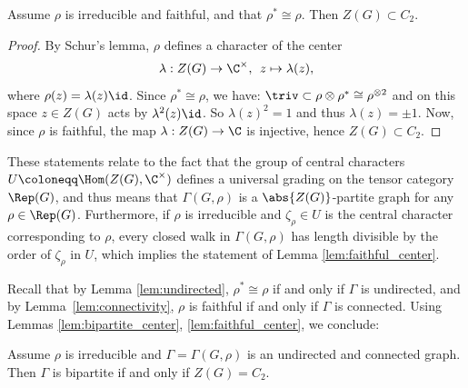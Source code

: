 \begin{lemma}\label{lem:faithful_center}
 Assume $\rho$ is irreducible and faithful, and that $\rho^* \cong \rho$. Then $Z(G) \subset C_2 $.
\end{lemma}

\begin{proof}
  By Schur's lemma, $\rho$ defines a character of the center $$\lambda:Z(G) \to \C^{\times}, \;\, z\mapsto \lambda(z),$$ where $\rho(z) = \lambda(z)\id$. Since $\rho^* \cong \rho$, we have: $\triv \subset \rho \otimes \rho^* \cong \rho^{\otimes 2}$ and on this space $z \in Z(G)$ acts by $\lambda^2(z)\id$. So $\lambda(z)^2 = 1$ and thus $\lambda(z)=\pm 1$. Now, since $\rho$ is faithful, the map $\lambda: Z(G) \to \C$ is injective, hence $Z(G) \subset C_2 $.
\end{proof}

\begin{rema}
 {These statements relate to the fact that the group of central characters $U\coloneqq \Hom(Z(G), \C^{\times})$ defines a universal grading on the tensor category $\Rep(G)$, and thus means that $\Gamma(G, \rho)$ is a $\abs{Z(G)}$-partite graph for any $\rho \in \Rep(G)$. Furthermore, if $\rho$ is irreducible and $\zeta_{\rho} \in U$ is the central character corresponding to $\rho$, every closed walk in $\Gamma(G, \rho)$ has length divisible by the order of $\zeta_{\rho}$ in $U$, which implies the statement of Lemma \ref{lem:faithful_center}.}
\end{rema}

Recall that by Lemma \ref{lem:undirected}, $\rho^* \cong \rho$ if and only if $\Gamma$ is undirected, and by Lemma~\ref{lem:connectivity}, $\rho$ is faithful if and only if $\Gamma$ is connected. Using Lemmas \ref{lem:bipartite_center}, \ref{lem:faithful_center}, we conclude:

\begin{coro}\label{cor:bipartite_center_Z_2}
 Assume $\rho$ is irreducible and $\Gamma = \Gamma(G, \rho)$ is an undirected and connected graph. Then $\Gamma$ is bipartite if and only if $Z(G) = C_2 $.
\end{coro}



